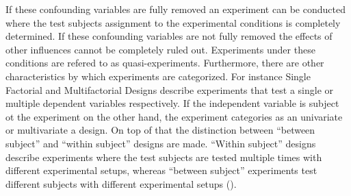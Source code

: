     If these confounding variables are fully removed an experiment can be conducted where the test subjects assignment to the experimental conditions is completely determined. If these confounding variables are not fully removed the effects of other influences cannot be completely ruled out. Experiments under these conditions are refered to as quasi-experiments.  
    Furthermore, there are other characteristics by which experiments are categorized. For instance Single Factorial and Multifactorial Designs describe experiments that test a single or multiple dependent variables respectively. If the independent variable is subject ot the experiment on the other hand, the experiment categories as an univariate or multivariate a design. On top of that the distinction between \enquote{between subject} and \enquote{within subject} designs are made. \enquote{Within subject} designs describe experiments where the test subjects are tested multiple times with different experimental setups, whereas \enquote{between subject} experiments test different subjects with different experimental setups (\cite{Gniewosz.2011}). 





